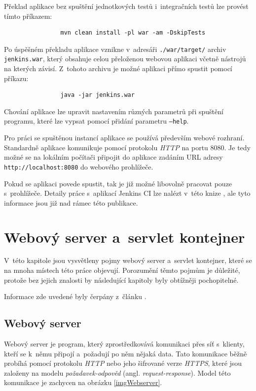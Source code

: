             Překlad aplikace bez spuštění jednotkových testů i~integračních testů lze provést tímto příkazem:
            \begin{verbatim}
                mvn clean install -pl war -am -DskipTests
            \end{verbatim}
            
            \medskip
            Po úspěšném překladu aplikace vznikne v~adresáři \texttt{./war/target/} archiv \texttt{jenkins.war}, 
            který obsahuje celou přeloženou webovou aplikaci včetně nástrojů na 
            kterých závisí. Z~tohoto archivu je možné aplikaci přímo spustit pomocí příkazu:

            \begin{verbatim}
                java -jar jenkins.war
            \end{verbatim}
            Chování aplikace lze upravit nastavením různých parametrů při spuštění programu, 
            které lze vypsat pomocí přidání parametru \texttt{--help}.

            Pro práci se spuštěnou instancí aplikace se používá především webové rozhraní. Standardně aplikace
            komunikuje pomocí protokolu \emph{HTTP} na portu 8080. Je tedy možné se na lokálním počítači připojit do aplikace zadáním URL adresy 
            \texttt{http://localhost:8080} do webového prohlížeče. 

            Pokud se aplikaci povede spustit, tak je již možné libovolně pracovat pouze s~prohlížeče. Detaily práce s~aplikací Jenkins CI
            lze nalézt v~této knize \cite{jenkinsBook}, ale tyto informace jsou již nad rámec této publikace.


            
       
    \section{Webový server a~servlet kontejner} \label{servletWebserver}
        V~této kapitole jsou vysvětleny pojmy webový server a~servlet kontejner, které se 
        na mnoha místech této práce objevují. Porozumění těmto pojmům je důležité, protože bez
        jejich znalosti by následující kapitoly byly obtížněji pochopitelné.
        
        Informace zde uvedené byly čerpány z~článku \cite{webserverVsServletPage}.

        \subsection{Webový server}
            Webový server je program, který zprostředkovává komunikaci přes síť s~klienty, kteří
            se k~němu připojí a~požadují po něm nějaká data. Tato komunikace běžně probíhá pomocí protokolu \emph{HTTP}
            nebo jeho šifrované verze \emph{HTTPS},
            které jsou založeny na modelu \emph{požadavek-odpověd} (angl. \emph{request-response}).
            Model této komunikace je zachycen na obrázku \ref{imgWebserver}.
            
